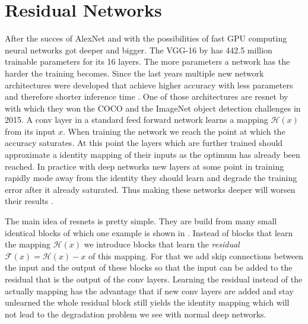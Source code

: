 \section{Residual Networks}
\label{sec:concepts:resnet}
After the succes of AlexNet \citep{krizhevsky_imagenet_2012} and with the possibilities of fast GPU computing neural networks got deeper and bigger.
The VGG-16 by \citet{simonyan_very_2014} has 442.5 million trainable parameters for its 16 layers. The more parameters a network has the harder the training becomes.
Since the last years multiple new network architectures were developed that achieve higher accuracy with less parameters and therefore shorter inference time \citep{canziani_analysis_2016}. One of those architectures are \gls{resnet} by \citet{he_deep_2016} with which they won the COCO  \citet{lin_microsoft_2014-1} and the ImageNet \citet{russakovsky_imagenet_2015} object detection challenges in 2015.
A \gls{conv} layer in a standard feed forward network learns a mapping $\mathcal{H}(x)$ from its input $x$. When training the network we reach the point at which the accuracy saturates. At this point the layers which are further trained should approximate a identity mapping of their inputs as the optimum has already been reached. In practice with deep networks new layers at some point in training rapidly mode away from the identity they should learn and degrade the training error after it already saturated. Thus making these networks deeper will worsen their results \citep{he_convolutional_2015}.


The main idea of \glspl{resnet} is pretty simple. They are build from many small identical blocks of which one example is shown in . Instead of blocks that learn the mapping $\mathcal{H}(x)$ we introduce blocks that learn the \textit{residual} $\mathcal{F}(x) = \mathcal{H}(x) - x$ of this mapping. For that we add skip connections between the input and the output of these blocks so that the input can be added to the residual that is the output of the \gls{conv} layers. Learning the residual instead of the actually mapping has the advantage that if new \gls{conv} layers are added and stay unlearned the whole residual block still yields the identity mapping which will not lead to the degradation problem we see with normal deep networks.

